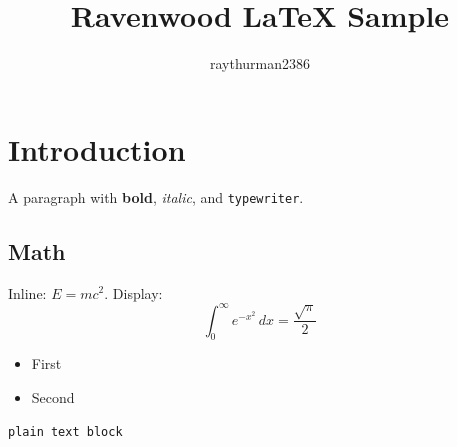 \documentclass{article}
\title{Ravenwood \LaTeX{} Sample}
\author{raythurman2386}
\begin{document}
\maketitle

\section{Introduction}
A paragraph with \textbf{bold}, \emph{italic}, and \texttt{typewriter}.

\subsection{Math}
Inline: $E = mc^2$. Display:
\begin{equation}
  \int_0^\infty e^{-x^2}\, dx = \frac{\sqrt{\pi}}{2}
\end{equation}

\begin{itemize}
  \item First
  \item Second
\end{itemize}

\begin{verbatim}
plain text block
\end{verbatim}
\end{document}
